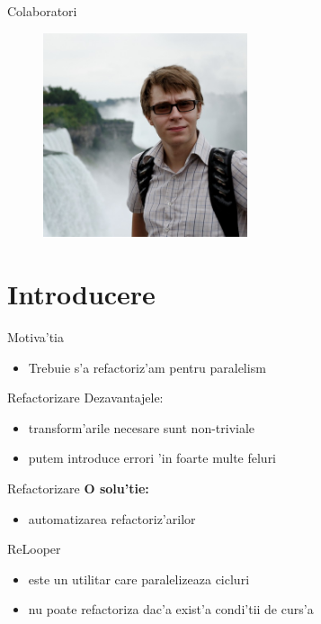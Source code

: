 \documentclass{beamer}
\begin{document}
\begin{frame}{Colaboratori}
\begin{figure}[h!]
	\begin{center}
		\includegraphics[width=6cm]{content/figures/caius.jpg}
	\end{center}
\end{figure}
\end{frame}

\Large

\section{Introducere}
\begin{frame}{Motiva'tia}
\huge
\begin{itemize}
  \item Trebuie s'a refactoriz'am pentru paralelism
\end{itemize}
\end{frame}

\begin{frame}{Refactorizare}
\Large
Dezavantajele:
\begin{itemize}
  \item \pause transform'arile necesare sunt non-triviale
  \item \pause putem introduce errori 'in foarte multe feluri
\end{itemize}
\end{frame}

\begin{frame}{Refactorizare}
\huge
\textbf{O solu'tie:}
\begin{itemize}
  \item \pause automatizarea refactoriz'arilor
\end{itemize}
\end{frame}

\begin{frame}{ReLooper}
\huge
\begin{itemize}
  \item este un utilitar care paralelizeaza cicluri
  \item \pause nu poate refactoriza dac'a exist'a condi'tii de curs'a
\end{itemize}

\end{frame}
\end{document}
